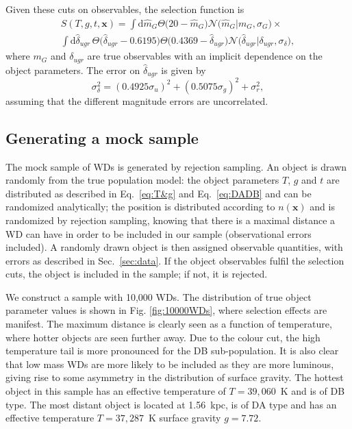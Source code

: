 \documentclass[fleqn,usenatbib]{mnras}
\newcommand{\Teff}{T}
\newcommand{\logg}{g}
\newcommand{\de}{\text{d}}
\begin{document}
Given these cuts on observables, the selection function is
\begin{equation}\label{eq:selection}
\begin{split}
	S(\Teff,\logg,t,\mathbf{x}) = 
    	      \int \de \hat{m}_G \Theta \big( 20-\hat{m}_G \big)\mathcal{N}\big( \hat{m}_G | m_G,\sigma_G \big) \times \\
    \int \de \hat{\delta}_{ugr}\,
    \Theta \big( \hat{\delta}_{ugr} -0.6195 \big)
    \Theta \big( 0.4369 - \hat{\delta}_{ugr} \big)
    \mathcal{N}\big( \hat{\delta}_{ugr} | \delta_{ugr},\sigma_{\delta}\big),
\end{split}
\end{equation}
where $m_G$ and $\delta_{ugr}$ are true observables with an implicit dependence on the object parameters. The error on $\hat{\delta}_{ugr}$ is given by
\begin{equation}
	\sigma_\delta^2 = (0.4925 \sigma_u)^2 + (0.5075 \sigma_g)^2 + \sigma_r^2,
\end{equation}
assuming that the different magnitude errors are uncorrelated.


\subsection{Generating a mock sample}

The mock sample of WDs is generated by rejection sampling. An object is drawn randomly from the true population model: the object parameters $\Teff$, $\logg$ and $t$ are distributed as described in Eq.~\eqref{eq:T&g} and Eq.~\eqref{eq:DADB} and can be randomized analytically; the position is distributed according to $n(\mathbf{x})$ and is randomized by rejection sampling, knowing that there is a maximal distance a WD can have in order to be included in our sample (observational errors included). A randomly drawn object is then assigned observable quantities, with errors as described in Sec.~\ref{sec:data}. If the object observables fulfil the selection cuts, the object is included in the sample; if not, it is rejected.

We construct a sample with 10,000 WDs. The distribution of true object parameter values is shown in Fig. \ref{fig:10000WDs}, where selection effects are manifest. The maximum distance is clearly seen as a function of temperature, where hotter objects are seen further away. Due to the colour cut, the high temperature tail is more pronounced for the DB sub-population. It is also clear that low mass WDs are more likely to be included as they are more luminous, giving rise to some asymmetry in the distribution of surface gravity. The hottest object in this sample has an effective temperature of $\Teff=39,060$~K and is of DB type. The most distant object is located at 1.56~kpc, is of DA type and has an effective temperature $\Teff=37,287$~K surface gravity $\logg=7.72$.
\end{document}
